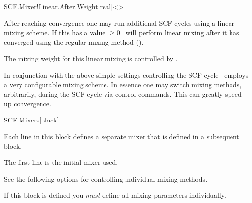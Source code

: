 \begin{fdfentry}{SCF.Mixer!Linear.After.Weight}[real]<>

  After reaching convergence one may run additional SCF cycles using a
  linear mixing scheme. If this has a value $\ge 0$ \siesta\ will
  perform linear mixing after it has converged using the regular
  mixing method ().

  The mixing weight for this linear mixing is controlled by .

\end{fdfentry}

In conjunction with the above simple settings controlling the SCF
cycle \siesta\ employs a very configurable mixing scheme. In essence
one may switch mixing methods, arbitrarily, during the SCF cycle via
control commands. This can greatly speed up convergence. 

\begin{fdfentry}{SCF.Mixers}[block]
  
  Each line in this block defines a separate mixer that is defined in
  a subsequent  block.

  The first line is the initial mixer used.

  See the following options for controlling individual mixing
  methods. 
  
  \note If this block is defined you \emph{must} define all mixing
  parameters individually.

\end{fdfentry}


